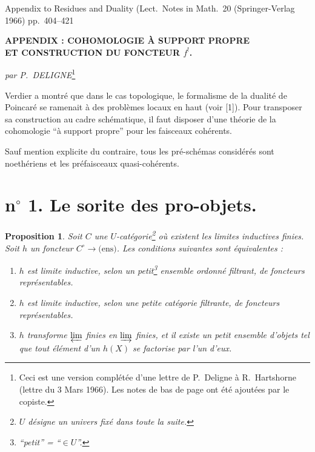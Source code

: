 \documentclass[12pt]{amsart}
\theoremstyle{plain}
\newtheorem{prop}{Proposition}
\theoremstyle{definition}
\begin{document}
\begin{center}
Appendix to Residues and Duality (Lect.\ Notes in Math.\ 20 (Springer-Verlag 1966) pp.\ 404--421
\end{center}

\bigskip

\begin{center}
\textbf{APPENDIX : COHOMOLOGIE \`A SUPPORT PROPRE}\\[4pt]
\textbf{ET CONSTRUCTION DU FONCTEUR $f^{!}$.}
\end{center}

\medskip

\begin{center}
\textit{par P.\ DELIGNE}\footnote{Ceci est une version compl\'et\'ee d'une lettre de P.\ Deligne \`a R.\ Hartshorne (lettre du 3 Mars 1966). Les notes de bas de page ont \'et\'e ajout\'ees par le copiste.}
\end{center}

\bigskip

Verdier a montr\'e que dans le cas topologique, le formalisme de la dualit\'e de Poincar\'e se ramenait \`a des probl\`emes locaux en haut (voir [1]). Pour transposer sa construction au cadre sch\'ematique, il faut disposer d'une th\'eorie de la cohomologie ``\`a support propre'' pour les faisceaux coh\'erents.

Sauf mention explicite du contraire, tous les pr\'e-sch\'emas consid\'er\'es sont noeth\'eriens et les pr\'efaisceaux quasi-coh\'erents.

\section*{n$^{\circ}$ 1. Le sorite des pro-objets.}

\begin{prop}
Soit $C$ une $U$-cat\'egorie\footnote{$U$ d\'esigne un univers fix\'e dans toute la suite.} o\`u existent les limites inductives finies.
Soit $h$ un foncteur $C^{\circ} \to \text{(ens)}$. Les conditions suivantes sont \'equivalentes :
\begin{enumerate}
\item[(i)] $h$ est limite inductive, selon un petit\footnote{``petit'' = ``$\in U$''.} ensemble ordonn\'e filtrant, de foncteurs repr\'esentables.
\item[(ii)] $h$ est limite inductive, selon une petite cat\'egorie filtrante, de foncteurs repr\'esentables.
\item[(iii)] $h$ transforme $\varprojlim$ finies en $\varinjlim$ finies, et il existe un petit ensemble d'objets tel que tout \'el\'ement d'un $h(X)$ se factorise par l'un d'eux.
\end{enumerate}
\end{prop}
\end{document}
